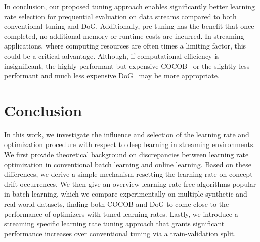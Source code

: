 \documentclass[runningheads]{llncs}
\begin{document}
In conclusion, our proposed tuning approach enables significantly better learning rate selection for prequential evaluation on data streams compared to both conventional tuning and DoG.
Additionally, pre-tuning has the benefit that once completed, no additional memory or runtime costs are incurred.
In streaming applications, where computing resources are often times a limiting factor, this could be a critical advantage.
Although, if computational efficiency is insignificant, the highly performant but expensive COCOB~\cite{orabonaTrainingDeepNetworks2017} or the slightly less performant and much less expensive DoG~\cite{ivgiDoGSGDBest2023} may be more appropriate.


\section{Conclusion}

In this work, we investigate the influence and selection of the learning rate and optimization procedure with respect to deep learning in streaming environments.
We first provide theoretical background on discrepancies between learning rate optimization in conventional batch learning and online learning.
Based on these differences, we derive a simple mechanism resetting the learning rate on concept drift occurrences.
We then give an overview learning rate free algorithms popular in batch learning, which we compare experimentally on multiple synthetic and real-world datasets,
finding both COCOB and DoG to come close to the performance of optimizers with tuned learning rates.
Lastly, we introduce a streaming specific learning rate tuning approach that grants significant performance increases over conventional tuning via a train-validation split.


\printbibliography
\end{document}
